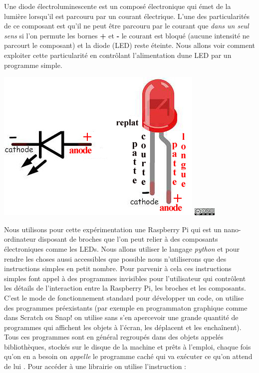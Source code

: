 \documentclass[11pt]{article}
\makeatletter
\def\maxwidth{\ifdim\Gin@nat@width>\linewidth\linewidth
    \else\Gin@nat@width\fi}
\let\Oldincludegraphics\includegraphics
\renewcommand{\includegraphics}[1]{\Oldincludegraphics[width=.8\maxwidth]{#1}}
\makeatother
\begin{document}
Une diode électroluminescente est un composé électronique qui émet de la
lumière lorsqu'il est parcouru par un courant électrique. L'une des
particularités de ce composant est qu'il ne peut être parcouru par le
courant que \emph{dans un seul sens} si l'on permute les bornes
\textbf{+} et \textbf{-} le courant est bloqué (aucune intensité ne
parcourt le composant) et la diode (LED) reste éteinte. Nous allons voir
comment exploiter cette particularité en contrôlant l'alimentation dune
LED par un programme simple.

\includegraphics{images/led_schema.jpg}
\includegraphics{images/Licence.jpg}

Nous utilisons pour cette expérimentation une Raspberry Pi qui est un
nano-ordinateur disposant de broches que l'on peut relier à des
composants électroniques comme les LEDs. Nous allons utiliser le langage
\emph{python} et pour rendre les choses aussi accessibles que possible
nous n'utiliserons que des instructions simples en petit nombre. Pour
parvenir à cela ces instructions simples font appel à des programmes
invisibles pour l'utilisateur qui contrôlent les détails de
l'interaction entre la Raspberry Pi, les broches et les composants.
C'est le mode de fonctionnement standard pour développer un code, on
utilise des programmes préexistants (par exemple en programmaton
graphique comme dans Scratch ou Snap! on utilise sans s'en apercevoir
une grande quantité de programmes qui affichent les objets à l'écran,
les déplacent et les enchaînent). Tous ces programmes sont en général
regroupés dans des objets appelés bibliothèques, stockés sur le disque
de la machine et prêts à l'emploi, chaque fois qu'on en a besoin on
\emph{appelle} le programme caché qui va exécuter ce qu'on attend de lui
. Pour accéder à une librairie on utilise l'instruction :
\end{document}
